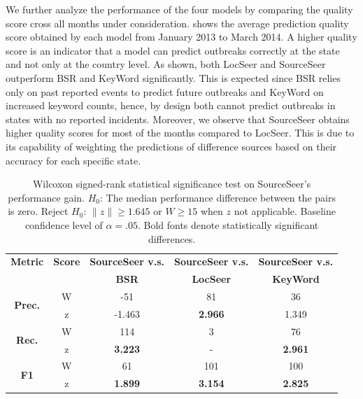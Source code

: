 \documentclass[twoside,leqno,twocolumn]{article}
\newcommand{\fullmodel}{{{\sf SourceSeer}}\xspace}
\newcommand{\locationmodel}{{\sf LocSeer}\xspace}
\newcommand{\keymodel}{{\sf KeyWord}\xspace}
\begin{document}
We further analyze the performance of the four models by comparing the quality score cross all months under consideration.  shows the average prediction quality score obtained by each model from January 2013 to March 2014. A higher quality score is an indicator that a model can predict outbreaks correctly at the state and not only at the country level. As shown, both \locationmodel and \fullmodel outperform BSR and \keymodel significantly. This is expected since BSR relies only on past reported events to predict future outbreaks and \keymodel on increased keyword counts, hence, by design both cannot predict outbreaks in states with no reported incidents. Moreover, we observe that \fullmodel obtains higher quality scores for most of the months compared to \locationmodel. This is due to its capability of weighting the predictions of difference sources  based on their accuracy for each specific state.

\begin{table}
\scriptsize \centering
\caption{Wilcoxon signed-rank statistical significance test on \fullmodel's performance gain. $H_0$: The median performance difference between the pairs is zero. Reject $H_0$: $\|z\| \geq 1.645$ or $W \geq 15$ when $z$ not applicable. Baseline confidence level of $\alpha =.05$. Bold fonts denote statistically significant differences.}
\begin{tabular}{|c|c|c|c|c|} 
\hline
{\bf Metric} & {\bf Score} & {\bf \fullmodel v.s.} & {\bf \fullmodel v.s.} & {\bf \fullmodel v.s.} \\ 
             &             & {\bf BSR}  & {\bf \locationmodel}       & {\bf \keymodel} \\ \hline
\multirow{2}{*}{{\bf Prec.}} & W & -51 & 81 & 36\\
& z & -1.463 & {\bf 2.966} & 1.349\\ \hline
\multirow{2}{*}{{\bf Rec.}} & W & 114 & 3&76\\
& z & {\bf 3.223} & -&{\bf 2.961}\\ \hline
\multirow{2}{*}{{\bf F1}} & W & 61 & 101&100\\
& z & {\bf 1.899} & {\bf 3.154}&{\bf2.825}\\ \hline
\end{tabular}
\label{tab:significance}
\end{table}
\end{document}
